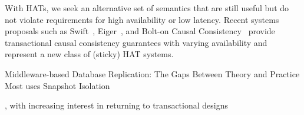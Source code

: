 With HATs, we seek an alternative set of semantics that are
still useful but do not violate requirements for high availability or
low latency. Recent systems proposals such as Swift~\cite{swift},
Eiger~\cite{eiger}, and Bolt-on Causal Consistency~\cite{bolton}
provide transactional causal consistency guarantees with varying
availability and represent a new class of (sticky) HAT systems.







Middleware-based Database Replication: The Gaps Between Theory and Practice
Most uses Snapshot Isolation




, with increasing interest in returning to transactional
designs~\cite{spanner, walter, foundation-article, krikellas-bargain,
  eiger}

